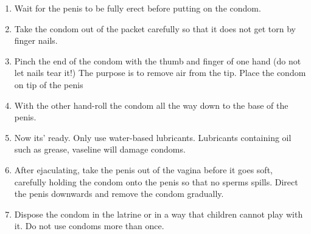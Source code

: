 \begin{enumerate}
\item Wait for the penis to be fully erect before putting on the condom.
\item Take the condom out of the packet carefully so that it does not get torn by finger nails.
\item Pinch the end of the condom with the thumb and finger of one hand (do not let nails tear
it!) The purpose is to remove air from the tip. Place the condom on tip of the penis
\item With the other hand-roll the condom all the way down to the base of the penis.
\item Now its' ready. Only use water-based lubricants. Lubricants containing oil such as
grease, vaseline will damage condoms.
\item After ejaculating, take the penis out of the vagina before it goes soft, carefully holding
the condom onto the penis so that no sperms spills. Direct the penis downwards and
remove the condom gradually.
\item Dispose the condom in the latrine or in a way that children cannot play with it. Do not
use condoms more than once.
\end{enumerate}

